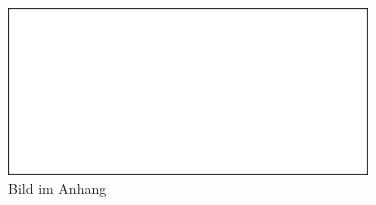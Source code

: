 \begin{figure}[H]
	\centering
		\includegraphics[width=0.85\textwidth]{03_Grafiken/PseudoImage.jpg}
	\caption[Bild im Anhang]{Bild im Anhang}
	\label{fig:BildAnhang}
\end{figure}